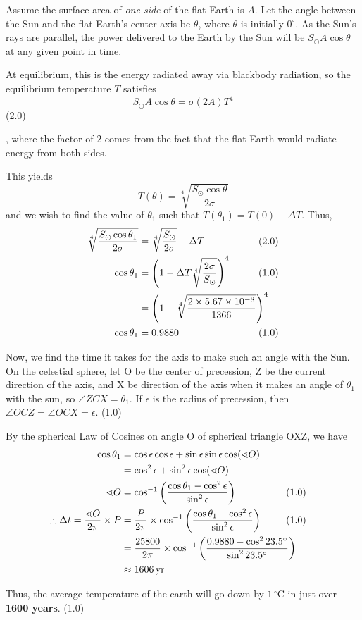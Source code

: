 Assume the surface area of \emph{one side} of the flat Earth is $A$. Let the angle between
the Sun and the flat Earth's center axis be $\theta$, where $\theta$ is initially $0^\circ$. As
the Sun's rays are parallel, the power delivered to the Earth by the Sun will be
$S_\odot A\cos\theta$ at any given point in time.

At equilibrium, this is the energy radiated away via blackbody radiation, so the equilibrium
temperature $T$ satisfies
\[
S_\odot A\cos\theta = \sigma(2A)T^4
\]
\hfill(2.0)

\noindent, where the factor of 2 comes from the fact that the flat Earth would radiate energy
from both sides.

This yields
\[
T(\theta) = \sqrt[4]{\frac{S_\odot\cos\theta}{2\sigma}}
\]
and we wish to find the value of $\theta_1$ such that $T(\theta_1) = T(0) - \Delta T$.
Thus,
\begin{align*}
\sqrt[4]{\frac{S_\odot\cos\theta_1}{2\sigma}} &= \sqrt[4]{\frac{S_\odot}{2\sigma}} - \Delta T
  & &\hspace{-2em}(2.0)\\
\cos\theta_1 &= \left(1 - \Delta T\sqrt[4]{\frac{2\sigma}{S_\odot}}\right)^4
  & &\hspace{-2em}(1.0)\\
 &= \left(1 - \sqrt[4]{\frac{2\times5.67\times10^{-8}}{1366}}\right)^4\\
\cos\theta_1 &= 0.9880
  & &\hspace{-2em}(1.0)
\end{align*}

Now, we find the time it takes for the axis to make such an angle with the Sun. On the
celestial sphere, let O be the center of precession, Z be the current direction of the axis,
and X be direction of the axis when it makes an angle of $\theta_1$ with the sun, so
$\angle ZCX = \theta_1$. If $\epsilon$ is the radius of precession, then
$\angle OCZ = \angle OCX = \epsilon$. \hfill(1.0)

By the spherical Law of Cosines on angle O of spherical triangle OXZ, we have
\begin{align*}
\cos\theta_1 &= \cos\epsilon\cos\epsilon + \sin\epsilon\sin\epsilon\cos(\sphericalangle O)\\
 &= \cos^2\epsilon + \sin^2\epsilon\cos(\sphericalangle O)\\
\sphericalangle O &= \cos^{-1}\left(\frac{\cos\theta_1 - \cos^2\epsilon}{\sin^2\epsilon}\right)
  & &\hspace{-2em}(1.0)\\
\therefore \Delta t = \frac{\sphericalangle O}{2\pi}\times P
 &= \frac{P}{2\pi}\times\cos^{-1}\left(\frac{\cos\theta_1 - \cos^2\epsilon}{\sin^2\epsilon}\right)
  & &\hspace{-2em}(1.0)\\
 &= \frac{25800}{2\pi}\times\cos^{-1}\left(\frac{0.9880 - \cos^2 23.5^\circ}{\sin^2 23.5^\circ}\right)\\
 &\approx 1606\,\mathrm{yr}
\end{align*}

Thus, the average temperature of the earth will go down by $1\,^\circ\mathrm{C}$ in just over
\textbf{1600 years}. \hfill(1.0)
